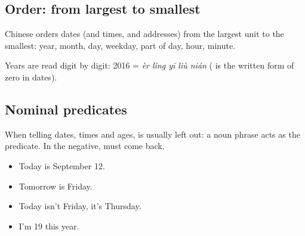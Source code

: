 \subsection{Order: from largest to smallest}

\begin{important}
Chinese orders dates (and times, and addresses) from the largest unit to the smallest:
year, month, day, weekday, part of day, hour, minute.
\end{important}

\begin{center}
\end{center}

Years are read digit by digit: 2016 =  \emph{èr líng yī liù nián}
( is the written form of zero in dates).

\subsection{Nominal predicates}

When telling dates, times and ages,  is usually left out: a noun phrase acts as
the predicate. In the negative,  must come back.
\begin{itemize}
  \item {} Today is September 12.
  \item {} Tomorrow is Friday.
  \item {} Today isn't Friday, it's Thursday.
  \item {} I'm 19 this year.
\end{itemize}

